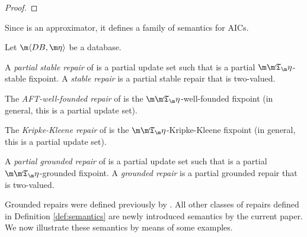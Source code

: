 \begin{proof}
\end{proof}

Since \Ap is an approximator, it defines a family of semantics for AICs. 

\begin{definition}\label{def:semantics}
 Let $\fulldb$ be a database. 
 \begin{compactitem}
  \item A \emph{partial stable repair} of \fulldb is a partial update set \UUU such that \UUU is a partial $\Ap$-stable fixpoint. A \emph{stable repair} is a partial stable repair that is two-valued. 
  \item The \emph{AFT-well-founded repair} of \fulldb is the $\Ap$-well-founded fixpoint (in general, this is a partial update set). 
  \item The \emph{Kripke-Kleene repair} of \fulldb is the $\Ap$-Kripke-Kleene fixpoint (in general, this is a partial update set). 
  \item A \emph{partial grounded repair} of \fulldb is a partial update set \UUU such that \UUU is a partial $\Ap$-grounded fixpoint. A \emph{grounded repair} is a partial grounded repair that is two-valued. 
 \end{compactitem}

\end{definition}


Grounded repairs were defined previously by \citet{}. All other classes of repairs defined in Definition \ref{def:semantics} are newly introduced semantics by the current paper. 
We now illustrate these semantics by means of some examples. 


